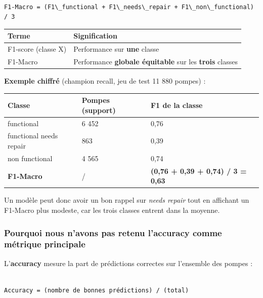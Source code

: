 \documentclass[11pt,a4paper]{report}
\begin{document}
\begin{lstlisting}

F1-Macro = (F1\_functional + F1\_needs\_repair + F1\_non\_functional) / 3

\end{lstlisting}



\begin{longtable}{@{}ll@{}}
\toprule
Terme & Signification \\
\midrule
F1-score (classe X) & Performance sur \textbf{une} classe \\
F1-Macro & Performance \textbf{globale équitable} sur les \textbf{trois} classes \\
\bottomrule
\end{longtable}




\textbf{Exemple chiffré} (champion recall, jeu de test 11 880 pompes) :



\begin{longtable}{@{}lll@{}}
\toprule
Classe & Pompes (support) & F1 de la classe \\
\midrule
functional & 6 452 & 0,76 \\
functional needs repair & 863 & 0,39 \\
non functional & 4 565 & 0,74 \\
\textbf{F1-Macro} & / & \textbf{(0,76 + 0,39 + 0,74) / 3 = 0,63} \\
\bottomrule
\end{longtable}




Un modèle peut donc avoir un bon rappel sur \textit{needs repair} tout en affichant un F1-Macro plus modeste, car les trois classes entrent dans la moyenne.



\subsubsection{Pourquoi nous n'avons pas retenu l'accuracy comme métrique principale}



L'\textbf{accuracy} mesure la part de prédictions correctes sur l'ensemble des pompes :



\begin{lstlisting}

Accuracy = (nombre de bonnes prédictions) / (total)

\end{lstlisting}
\end{document}
